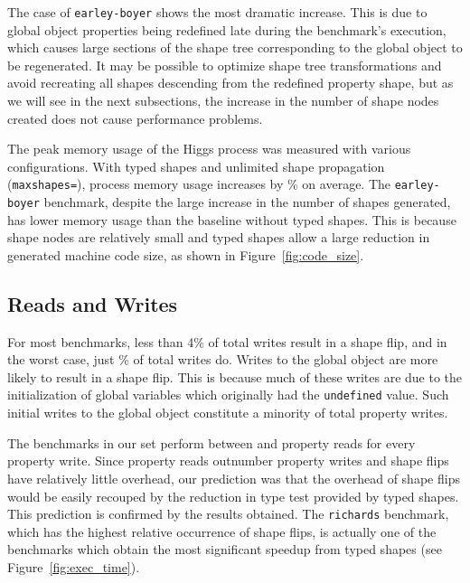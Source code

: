 \documentclass[preprint]{sigplanconf}
\newcommand{\stat}[1]{\unskip}
\newcommand{\percentstat}[1]{\unskip\%}
\begin{document}
The case of {\tt earley-boyer} shows the most dramatic increase. This is due
to global object properties being redefined late during the benchmark's
execution, which causes large sections of the shape tree corresponding to
the global object to be regenerated. It may be possible to optimize shape tree
transformations and avoid recreating all shapes descending from the redefined
property shape, but as we will see in the next subsections, the increase in
the number of shape nodes created does not cause performance problems.

The peak memory usage of the Higgs process was measured with various
configurations. With typed shapes and unlimited shape propagation
({\tt maxshapes=}), process memory usage increases by
\percentstat{memusage_incr} on average. The {\tt earley-boyer} benchmark,
despite the large increase in the number of shapes generated, has
lower memory usage than the baseline without typed shapes. This is because
shape nodes are relatively small and typed shapes allow a large reduction
in generated machine code size, as shown in Figure~\ref{fig:code_size}.

\subsection{Reads and Writes}\label{sec:reads-writes}



For most benchmarks, less than 4\% of total writes result in a shape flip,
and in the worst case, just \percentstat{numflips_max_all_objects} of total
writes do. Writes to the global object are more likely to
result in a shape flip. This is because much of these writes are due to the
initialization of global variables which originally had the {\tt undefined}
value. Such initial writes to the global object constitute a minority of
total property writes.

The benchmarks in our set perform between \stat{readstowrites_min} and 
\stat{readstowrites_max} property reads for every property write. Since
property reads outnumber property writes and shape flips have relatively little
overhead, our prediction was that the overhead of shape flips would be easily
recouped by the reduction in type test provided by typed shapes. This
prediction is confirmed by the results obtained. The {\tt richards} benchmark,
which has the highest relative occurrence of shape flips, is actually one of
the benchmarks which obtain the most significant speedup from typed shapes
(see Figure~\ref{fig:exec_time}).
\end{document}
